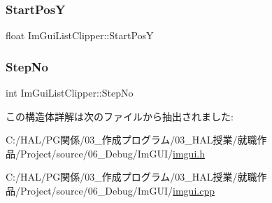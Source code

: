 \subsubsection{\texorpdfstring{Start\+PosY}{StartPosY}}
{\footnotesize\ttfamily float Im\+Gui\+List\+Clipper\+::\+Start\+PosY}

\mbox{\label{struct_im_gui_list_clipper_a8fe78f0368e16425c33fd35ca45d1912}} 
\subsubsection{\texorpdfstring{Step\+No}{StepNo}}
{\footnotesize\ttfamily int Im\+Gui\+List\+Clipper\+::\+Step\+No}



この構造体詳解は次のファイルから抽出されました\+:\begin{DoxyCompactItemize}
\item 
C\+:/\+H\+A\+L/\+P\+G関係/03\+\_\+作成プログラム/03\+\_\+\+H\+A\+L授業/就職作品/\+Project/source/06\+\_\+\+Debug/\+Im\+G\+U\+I/\mbox{\hyperlink{imgui_8h}{imgui.\+h}}\item 
C\+:/\+H\+A\+L/\+P\+G関係/03\+\_\+作成プログラム/03\+\_\+\+H\+A\+L授業/就職作品/\+Project/source/06\+\_\+\+Debug/\+Im\+G\+U\+I/\mbox{\hyperlink{imgui_8cpp}{imgui.\+cpp}}\end{DoxyCompactItemize}
